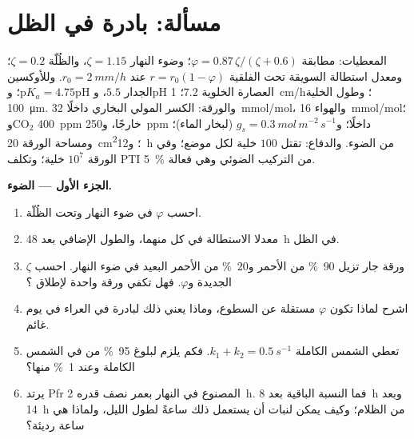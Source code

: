 \section{مسألة: بادرة في الظل}

\begin{problem}
\label{pb:b3:plant-molecular-physiology:1}
المعطيات: مطابقة  $\varphi = 0.87\,\zeta/(\zeta + 0.6)$؛
وضوء النهار $\zeta = 1.15$، والظُلّة $\zeta = 0.2$؛ ومعدل استطالة
السويقة تحت الفلقية $r = r_{0}(1 - \varphi)$ عند $r_{0} = \qty{2}{mm/h}$.
وللأوكسين $\mathrm{p}K_{a} = 4.75$؛ وpH الجدار $5.5$، وpH العصارة
الخلوية $7.2$؛  \qty{1}{cm/h}؛ وطول الخلية \qty{100}{\micro m}.
والورقة: الكسر المولي البخاري داخلًا \qty{32}{mmol/mol}، والهواء
\qty{16}{mmol/mol}؛ وCO$_{2}$ \qty{400}{ppm} خارجًا، و\qty{250}{ppm}
داخلًا؛ و$g_{s} =
\qty{0.3}{mol\,m^{-2}\,s^{-1}}$ (لبخار الماء)؛
ومساحة الورقة \qty{20}{cm^2}؛ و\qty{12}{h} من الضوء. والدفاع:
تقتل  $100$ خلية لكل موضع؛ وفي الورقة
$10^{7}$ خلية؛ وتكلف PTI \qty{5}{\%} من التركيب الضوئي وهي فعالة.

\medskip
\noindent\textbf{الجزء الأول --- الضوء.}
\begin{enumerate}
  \item احسب $\varphi$ في ضوء النهار وتحت الظُلّة.
  \item معدلا الاستطالة في كل منهما، والطول الإضافي بعد
        \qty{48}{h} في الظل.
  \item ورقة جار تزيل \qty{90}{\%} من الأحمر و\qty{20}{\%} من
        الأحمر البعيد في ضوء النهار. احسب $\zeta$ الجديدة
        و$\varphi$. فهل تكفي ورقة واحدة لإطلاق ؟
  \item اشرح لماذا تكون $\varphi$ مستقلة عن السطوع، وماذا يعني
        ذلك لبادرة في العراء في يوم غائم.
  \item تعطي الشمس الكاملة $k_{1} + k_{2} = \qty{0.5}{s^{-1}}$.
        فكم يلزم لبلوغ \qty{95}{\%} من  في الشمس
        الكاملة وعند \qty{1}{\%} منها؟
  \item يرتد Pfr المصنوع في النهار بعمر نصف قدره \qty{2}{h}.
        فما النسبة الباقية بعد \qty{8}{h} وبعد \qty{14}{h} من
        الظلام؛ وكيف يمكن لنبات أن يستعمل ذلك ساعةً لطول
        الليل، ولماذا هي ساعة رديئة؟
\end{enumerate}


\end{problem}

